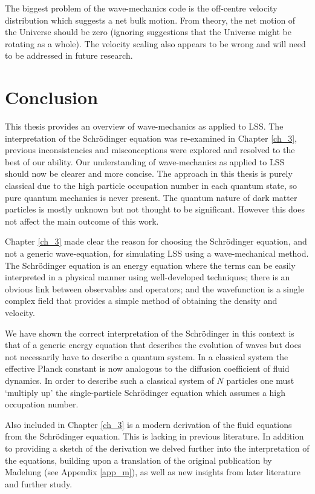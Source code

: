 The biggest problem of the wave-mechanics code is the off-centre velocity distribution which suggests a net bulk motion. From theory, the net motion of the Universe should be zero (ignoring suggestions that the Universe might be rotating as a whole). The velocity scaling also appears to be wrong and will need to be addressed in future research.

%
%
\chapter{Conclusion}
\label{ch_6}
This thesis provides an overview of wave-mechanics as applied to LSS. The interpretation of the Schr\"odinger equation was re-examined in Chapter \ref{ch_3}, previous inconsistencies and misconceptions were explored and resolved to the best of our ability. Our understanding of wave-mechanics as applied to LSS should now be clearer and more concise. The approach in this thesis is purely classical due to the high particle occupation number in each quantum state, so pure quantum mechanics is never present. The quantum nature of dark matter particles is mostly unknown but not thought to be significant. However this does not affect the main outcome of this work.

Chapter \ref{ch_3} made clear the reason for choosing the Schr\"odinger equation, and not a generic wave-equation, for simulating LSS using a wave-mechanical method. The Schr\"odinger equation is an energy equation where the terms can be easily interpreted in a physical manner using well-developed techniques; there is an obvious link between observables and operators; and the wavefunction is a single complex field that provides a simple method of obtaining the density and velocity.

We have shown the correct interpretation of the Schr\"odinger in this context is that of a generic energy equation that describes the evolution of waves but does not necessarily have to describe a quantum system. In a classical system the effective Planck constant is now analogous to the diffusion coefficient of fluid dynamics. In order to describe such a classical system of $N$ particles one must `multiply up' the single-particle Schr\"odinger equation which assumes a high occupation number.

Also included in Chapter \ref{ch_3} is a modern derivation of the fluid equations from the Schr\"odinger equation. This is lacking in previous  literature. In addition to providing a sketch of the derivation we delved further into the interpretation of the equations, building upon a translation of the original publication by Madelung (see Appendix \ref{app_m}), as well as new insights from later literature and further study.

